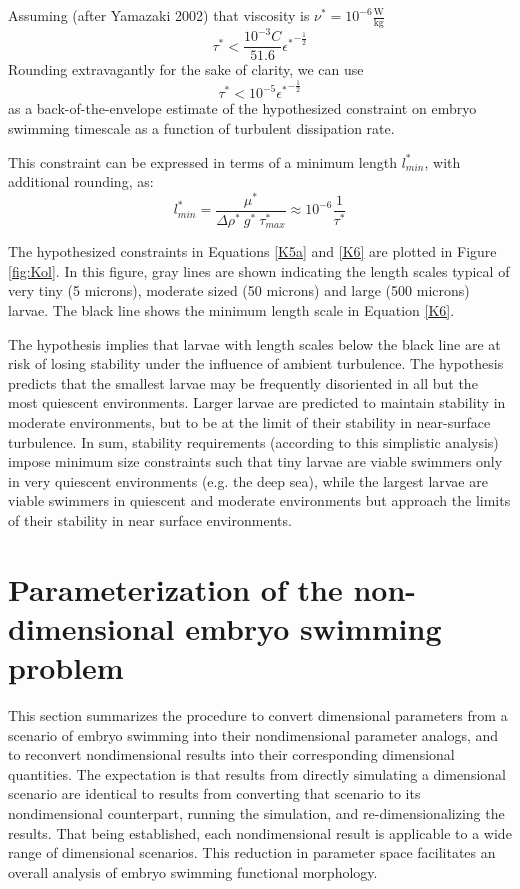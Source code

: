 \documentclass[10pt,a4paper]{article}
\begin{document}
Assuming (after Yamazaki 2002) that viscosity is $\nu^* = 10^{-6} \mathrm{\frac{W}{kg}}$
\begin{equation}\label{K5}
	\tau^* < \frac{10^{-3} C}{51.6} {\epsilon^*}^{-\frac{1}{2}}
\end{equation}
Rounding extravagantly for the sake of clarity, we can use 
\begin{equation}\label{K5a}
	\tau^* < 10^{-5} {\epsilon^*}^{-\frac{1}{2}}
\end{equation}
as a back-of-the-envelope estimate of the hypothesized constraint on embryo swimming timescale as a function of turbulent dissipation rate.

This constraint can be expressed in terms of a minimum length $l_{min}^*$, with additional rounding, as:
\begin{equation}\label{K6}
	l_{min}^* = \frac{\mu^*}{\Delta \rho^* ~ g^* ~ \tau_{max}^*} \approx 10^{-6} \frac{1}{\tau^*}
\end{equation}

The hypothesized constraints in Equations \ref{K5a} and \ref{K6} are plotted in Figure \ref{fig:Kol}.
In this figure, gray lines are shown indicating the length scales typical of very tiny (5 microns), moderate sized (50 microns) and large (500 microns) larvae. 
The black line shows the minimum length scale in Equation \ref{K6}. 

The hypothesis implies that larvae with length scales below the black line are at risk of losing stability under the influence of ambient turbulence.
The hypothesis predicts that the smallest larvae may be frequently disoriented in all but the most quiescent environments.
Larger larvae are predicted to maintain stability in moderate environments, but to be at the limit of their stability in near-surface turbulence.
In sum, stability requirements (according to this simplistic analysis) impose minimum size constraints such that tiny larvae are viable swimmers only in very quiescent environments (e.g. the deep sea), while the largest larvae are viable swimmers in quiescent and moderate environments but approach the limits of their stability in near surface environments. 




\section{Parameterization of the non-dimensional embryo swimming problem}\label{NDparsSect}
This section summarizes the procedure to convert dimensional parameters from a scenario of embryo swimming into their nondimensional parameter analogs, and to reconvert nondimensional results into their corresponding dimensional quantities.
The expectation is that results from directly simulating a dimensional scenario are identical to results from converting that scenario to its nondimensional counterpart, running the simulation, and re-dimensionalizing the results.
That being established, each nondimensional result is applicable to a wide range of dimensional scenarios. This reduction in parameter space facilitates an overall analysis of embryo swimming functional morphology.
\end{document}

